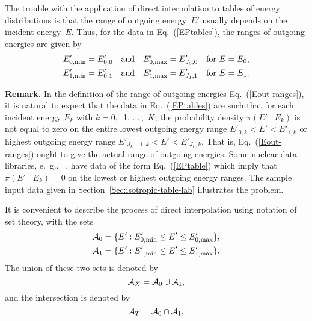 The trouble with the application of direct interpolation to tables of 
energy distributions
 is that the range of outgoing energy~$E'$
usually depends on the incident energy~$E$.
Thus, for the data in Eq.~(\ref{EPtables}), the ranges of outgoing energies
are given by
\begin{equation}
\begin{split}
  E_{0,\text{min}}' =  E'_{0,0} \quad \text{and} \quad
           E_{0,\text{max}}' = E'_{J_0,0} \quad \text{for $E = E_0$}, \\
  E_{1,\text{min}}' =  E'_{0,1} \quad \text{and} \quad
           E_{1,\text{max}}' = E'_{J_1,1} \quad \text{for $E = E_1$}.
  \label{Eout-ranges}
\end{split}
\end{equation}

\textbf{Remark.}
In the definition of the range of outgoing energies Eq.~(\ref{Eout-ranges}),
it is natural to expect that the data in Eq.~(\ref{EPtables}) are such that
for each incident energy $E_k$ with $k = 0,$~1, $\ldots\,$,~$K$, the probability
density $\pi(E' \mid E_k )$ is not equal to zero on the entire lowest outgoing
energy range $E'_{0,k} < E' < E'_{1,k}$ or highest outgoing energy range
$E'_{J_k - 1,k} < E' < E'_{J_k,k}$.  That is, 
Eq.~(\ref{Eout-ranges}) ought to give the
actual range of outgoing energies.
Some nuclear data libraries, e.~g.,
\ENDFdata~\cite{ENDFdata}, have
data of the form Eq.~(\ref{EPtable}) which imply that
$\pi(E' \mid E_k ) = 0$ on the lowest or highest outgoing energy ranges.
The sample input data given in
Section~\ref{Sec:isotropic-table-lab} illustrates the problem.

It is convenient to describe the process of direct interpolation using
notation of set theory, with the sets
\begin{equation}
\begin{split}
  {\cal A}_0 = \{ E': E_{0,\text{min}}' \le E' \le
           E_{0,\text{max}}' \}, \\
  {\cal A}_1 = \{ E':   E_{1,\text{min}}' \le E' \le
           E_{1,\text{max}}' \}.
  \label{def-calA01}
\end{split}
\end{equation}
The union of these two sets is denoted by
\begin{equation}
   {\cal A}_X = {\cal A}_0 \cup {\cal A}_1,
 \label{def-calA-X}
\end{equation}
and the intersection is denoted by
\begin{equation}
   {\cal A}_T = {\cal A}_0 \cap {\cal A}_1,
 \label{def-calA-T}
\end{equation}

